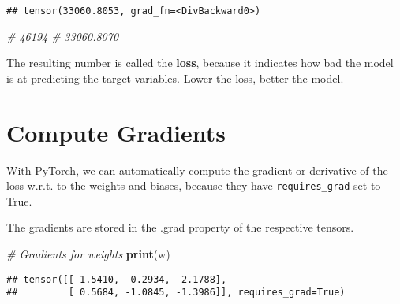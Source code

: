 \documentclass[]{book}
\newenvironment{Shaded}{\begin{snugshade}}{\end{snugshade}}
\newcommand{\CommentTok}[1]{\textcolor[rgb]{0.56,0.35,0.01}{\textit{#1}}}
\newcommand{\KeywordTok}[1]{\textcolor[rgb]{0.13,0.29,0.53}{\textbf{#1}}}
\newcommand{\NormalTok}[1]{#1}
\newcommand{\OperatorTok}[1]{\textcolor[rgb]{0.81,0.36,0.00}{\textbf{#1}}}
\begin{document}
\begin{verbatim}
## tensor(33060.8053, grad_fn=<DivBackward0>)
\end{verbatim}

\begin{Shaded}
\begin{Highlighting}[]
\CommentTok{# 46194}
\CommentTok{# 33060.8070}
\end{Highlighting}
\end{Shaded}

The resulting number is called the \textbf{loss}, because it indicates how bad the model is at predicting the target variables. Lower the loss, better the model.

\hypertarget{compute-gradients}{%
\section{Compute Gradients}\label{compute-gradients}}

With PyTorch, we can automatically compute the gradient or derivative of the loss w.r.t. to the weights and biases, because they have \texttt{requires\_grad} set to True.

\begin{Shaded}
\end{Shaded}

The gradients are stored in the .grad property of the respective tensors.

\begin{Shaded}
\begin{Highlighting}[]
\CommentTok{# Gradients for weights}
\KeywordTok{print}\NormalTok{(w)}
\end{Highlighting}
\end{Shaded}

\begin{verbatim}
## tensor([[ 1.5410, -0.2934, -2.1788],
##         [ 0.5684, -1.0845, -1.3986]], requires_grad=True)
\end{verbatim}

\begin{Shaded}
\end{Shaded}
\end{document}

